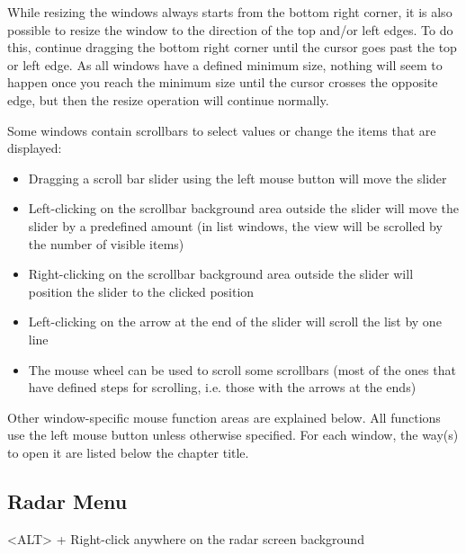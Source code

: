 \documentclass[a4paper,oneside,11pt]{memoir}
\begin{document}
\bigskip

While resizing the windows always starts from the bottom right corner, it is also possible to resize the window to the direction of the top and/or left edges. To do this, continue dragging the bottom right corner until the cursor goes past the top or left edge. As all windows have a defined minimum size, nothing will seem to happen once you reach the minimum size until the cursor crosses the opposite edge, but then the resize operation will continue normally.

\bigskip

Some windows contain scrollbars to select values or change the items that are displayed:

\bigskip

\begin{itemize}
    \item Dragging a scroll bar slider using the left mouse button will move the slider
    \item Left-clicking on the scrollbar background area outside the slider will move the slider by a predefined amount (in list windows, the view will be scrolled by the number of visible items)
    \item Right-clicking on the scrollbar background area outside the slider will position the slider to the clicked position
    \item Left-clicking on the arrow at the end of the slider will scroll the list by one line
    \item The mouse wheel can be used to scroll some scrollbars (most of the ones that have defined steps for scrolling, i.e. those with the arrows at the ends)
\end{itemize}

\bigskip

Other window-specific mouse function areas are explained below. All functions use the left mouse button unless otherwise specified. For each window, the way(s) to open it are listed below the chapter title.

\subsection{Radar Menu}
\label{menu:radarm}

<ALT> + Right-click anywhere on the radar screen background

\end{document}
